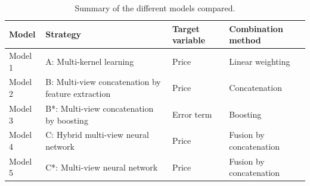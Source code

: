 \documentclass[letterpaper]{article} %
\begin{document}
\begin{table}[h]
\centering
\begin{tabular}{|l|l|l|l|}
\hline
\textbf{Model} & \textbf{Strategy} & \textbf{Target variable}& \textbf{Combination method} \\
\hline
Model 1  & A: Multi-kernel learning & Price & Linear weighting \\
Model 2 & B: Multi-view concatenation by feature extraction & Price & Concatenation \\
Model 3 & B*: Multi-view concatenation by boosting & Error term & Boosting \\
Model 4 & C: Hybrid multi-view neural network & Price & Fusion by concatenation \\
Model 5 & C*: Multi-view neural network & Price & Fusion by concatenation \\
\hline
\end{tabular}
\caption{Summary of the different models compared.}
\label{tab:trained_models}
\end{table}
\end{document}
